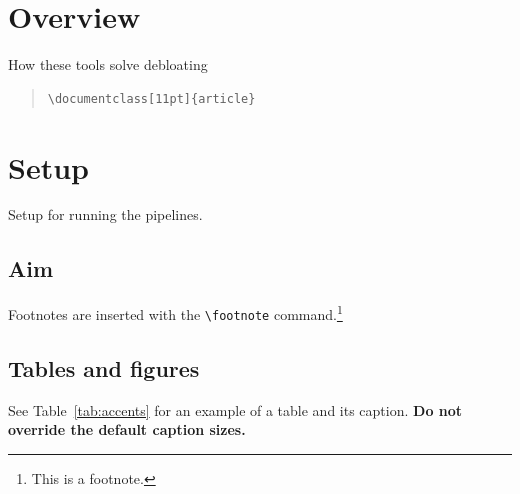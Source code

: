 \documentclass[9pt]{article}
\begin{document}
\section{Overview}

How these tools solve debloating
\begin{quote}
\begin{verbatim}
\documentclass[11pt]{article}
\end{verbatim}
\end{quote}


\section{Setup}
Setup for running the pipelines. 

\subsection{Aim}
Footnotes are inserted with the \verb|\footnote| command.\footnote{This is a footnote.}

\subsection{Tables and figures}

See Table~\ref{tab:accents} for an example of a table and its caption.
\textbf{Do not override the default caption sizes.}
\end{document}

